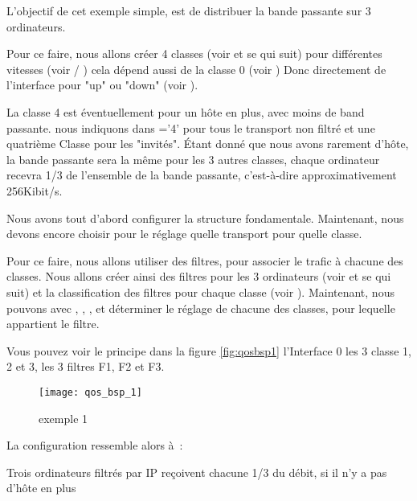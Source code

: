     L'objectif de cet exemple simple, est de distribuer la bande
    passante sur 3 ordinateurs.

    Pour ce faire, nous allons créer 4 classes (voir  et
    se qui suit) pour différentes vitesses (voir
     / )
    cela dépend aussi de la classe 0 (voir )
    Donc directement de l'interface pour "up" ou "down" (voir ).

    La classe 4 est éventuellement pour un hôte en plus, avec moins de band
    passante. nous indiquons dans  ='4'
    pour tous le transport non filtré et une quatrième Classe pour les
    "invités". Étant donné que nous avons rarement d'hôte, la bande passante
    sera la même pour les 3 autres classes, chaque ordinateur recevra 1/3 de
    l'ensemble de la bande passante, c'est-à-dire approximativement 256Kibit/s.

    Nous avons tout d'abord configurer la structure fondamentale. Maintenant,
    nous devons encore choisir pour le réglage quelle transport pour quelle classe.

    Pour ce faire, nous allons utiliser des filtres, pour associer le trafic à
    chacune des classes. Nous allons créer ainsi des filtres pour les 3 ordinateurs (voir
     et se qui suit) et la classification des filtres
    pour chaque classe (voir ). Maintenant, nous
    pouvons avec , ,
    ,  et
     déterminer le réglage de chacune des
    classes, pour lequelle appartient le filtre.

    Vous pouvez voir le principe dans la figure \ref{fig:qosbsp1}
    l'Interface 0 les 3 classe 1, 2 et 3, les 3 filtres F1, F2 et F3.

    \begin{figure}[htbp]
      \centering
      \texttt{[image: qos\_bsp\_1]}
      \caption{exemple 1}
    \end{figure}

    La configuration ressemble alors à~:

    Trois ordinateurs filtrés par IP reçoivent chacune 1/3 du débit,
    si il n'y a pas d'hôte en plus

